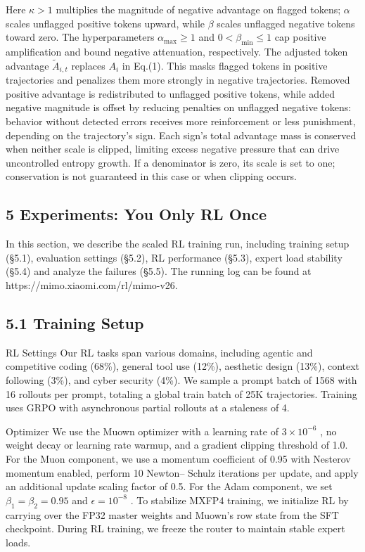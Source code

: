 \documentclass[
  10
]{article}
\begin{document}
Here \(\kappa > 1\) multiplies the magnitude of negative advantage on
flagged tokens; \(\alpha\) scales unflagged positive tokens upward,
while \(\beta\) scales unflagged negative tokens toward zero. The
hyperparameters \(\alpha _ { \operatorname* { m a x } } \geq 1\) and
\(0 < \beta _ { \mathrm { m i n } } \le 1\) cap positive amplification
and bound negative attenuation, respectively. The adjusted token
advantage \(\widetilde { A } _ { i , t }\) replaces \(A _ { i }\) in
Eq.(1). This masks flagged tokens in positive trajectories and penalizes
them more strongly in negative trajectories. Removed positive advantage
is redistributed to unflagged positive tokens, while added negative
magnitude is offset by reducing penalties on unflagged negative tokens:
behavior without detected errors receives more reinforcement or less
punishment, depending on the trajectory's sign. Each sign's total
advantage mass is conserved when neither scale is clipped, limiting
excess negative pressure that can drive uncontrolled entropy growth. If
a denominator is zero, its scale is set to one; conservation is not
guaranteed in this case or when clipping occurs.

\subsection{5 Experiments: You Only RL
Once}\label{experiments-you-only-rl-once}

In this section, we describe the scaled RL training run, including
training setup (§5.1), evaluation settings (§5.2), RL performance
(§5.3), expert load stability (§5.4) and analyze the failures (§5.5).
The running log can be found at https://mimo.xiaomi.com/rl/mimo-v26.

\subsection{5.1 Training Setup}\label{training-setup}

RL Settings Our RL tasks span various domains, including agentic and
competitive coding (68\%), general tool use (12\%), aesthetic design
(13\%), context following (3\%), and cyber security (4\%). We sample a
prompt batch of 1568 with 16 rollouts per prompt, totaling a global
train batch of 25K trajectories. Training uses GRPO with asynchronous
partial rollouts at a staleness of 4.

Optimizer We use the Muown optimizer with a learning rate of
\(3 \times 1 0 ^ { - 6 }\) , no weight decay or learning rate warmup,
and a gradient clipping threshold of 1.0. For the Muon component, we use
a momentum coefficient of 0.95 with Nesterov momentum enabled, perform 10
Newton-- Schulz iterations per update, and apply an additional update
scaling factor of 0.5. For the Adam component, we set
\(\beta _ { 1 } = \beta _ { 2 } = 0 . 9 5\) and
\(\epsilon = 1 0 ^ { - 8 }\) . To stabilize MXFP4 training, we
initialize RL by carrying over the FP32 master weights and Muown's row
state from the SFT checkpoint. During RL training, we freeze the router
to maintain stable expert loads.
\end{document}
